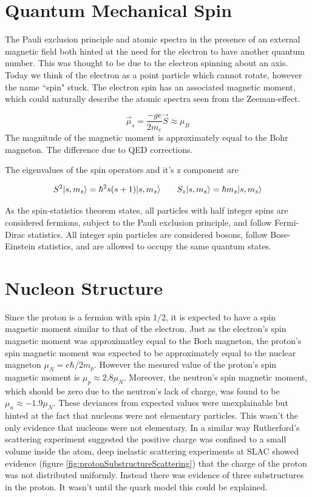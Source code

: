 \documentclass[abstract = on,listof=totoc, bibliography=totoc]{scrreprt}
\DeclarePairedDelimiter\ket{\lvert}{\rangle}
\begin{document}
\section{Quantum Mechanical Spin}

The Pauli exclusion principle and atomic spectra in the presence of an external magnetic field both hinted at the need for the electron to have another quantum number. This was thought to be due to the electron spinning about an axis. Today we think of the electron as a point particle which cannot rotate, however the name ``spin" stuck. The electron spin has an associated magnetic moment, which could naturally describe the atomic spectra seen from the Zeeman-effect.  

\begin{equation}
\vec{\mu}_s = \frac{-ge}{2m_e}\vec{S} \approx \mu_B
\end{equation}
The magnitude of the magnetic moment is approximately equal to the Bohr magneton. The difference due to QED corrections.

The eigenvalues of the spin operators and it's z component are 

\begin{equation}
S^2 \ket{s,m_s} = \hbar^2s(s+1)\ket{s,m_s} \;\;\;\;\;\;\; S_z \ket{s,m_s} = \hbar m_s \ket{s,m_s}
\end{equation}

As the spin-statistics theorem states, all particles with half integer spins are considered fermions, subject to the Pauli exclusion principle, and follow Fermi-Dirac statistics. All integer spin particles are considered bosons, follow Bose-Einstein statistics, and are allowed to occupy the same quantum states. 

\section{Nucleon Structure}

Since the proton is a fermion with spin 1/2, it is expected to have a spin magnetic moment similar to that of the electron. Just as the electron's spin magnetic moment was approximatley equal to the Borh magneton, the proton's spin magnetic moment was expected to be approximately equal to the nuclear magneton $\mu_N = e\hbar/2m_p$. However the mesured value of the proton's spin magnetic moment is $\mu_p \approx 2.8 \mu_N$. Moreover, the neutron's spin magnetic moment, which should be zero due to the neutron's lack of charge,  was found to be $\mu_n \approx -1.9\mu_N$. These deviances from expected values were unexplainable but hinted at the fact that nucleons were not elementary particles. This wasn't the only evidence that nucleons were not elementary.  In a similar way Rutherford's scattering experiment suggested the positive charge was confined to a small volume inside the atom, deep inelastic scattering experiments at SLAC showed evidence (figure \ref{fig:protonSubstructureScattering}) that the charge of the proton was not distributed uniformly. Instead there was evidence of three substructures in the proton. It wasn't until the quark model this could be explained.
\end{document}
